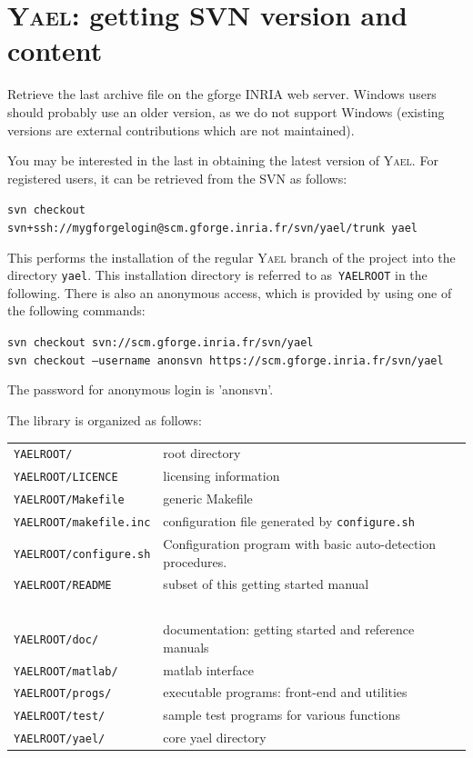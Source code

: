 \documentclass[a4paper,11pt,notitlepage,final,twoside]{report}
\newcommand{\yael}{\textsc{Yael}\xspace}
\newcommand{\yroot}{\texttt{YAELROOT}\xspace}
\newcommand{\tc}[1]{\texttt{#1}}
\newcommand{\code}[1]{\smallskip 

\texttt{#1} 
 \medskip

}
\begin{document}
\section{\yael: getting SVN version and content}

Retrieve the last archive file on the gforge INRIA web server. 
Windows users should probably use an older version, as we do not support Windows (existing 
versions are external contributions which are not maintained). 
\medskip

You may be interested in the last in obtaining the latest version of \yael. 
For registered users, it can be retrieved from the SVN as follows:

\code{svn checkout svn+ssh://mygforgelogin@scm.gforge.inria.fr/svn/yael/trunk yael}

This performs the installation of the regular \yael branch of the project into the directory \texttt{yael}. 
This installation directory is referred to as~\yroot in the following. 
There is also an anonymous access, which is provided by using one of the following commands:

\code{svn checkout svn://scm.gforge.inria.fr/svn/yael \\
svn checkout --username anonsvn https://scm.gforge.inria.fr/svn/yael
}

The password for anonymous login is 'anonsvn'. 
\medskip


The library is organized as follows: 
\smallskip

\begin{tabular}{ll}
\tc{\yroot/}         & root directory \\
\tc{\yroot/LICENCE}  & licensing information \\
\tc{\yroot/Makefile} & generic Makefile \\
\tc{\yroot/makefile.inc}  & configuration file generated by \tc{configure.sh}\\
\tc{\yroot/configure.sh}  & Configuration program with basic auto-detection procedures.  \\
\tc{\yroot/README}   & subset of this getting started manual \\
~\\
\tc{\yroot/doc/}     & documentation: getting started and reference manuals \\
\tc{\yroot/matlab/}  & matlab interface \\
\tc{\yroot/progs/}   & executable programs: front-end and utilities \\
\tc{\yroot/test/}    & sample test programs for various functions \\
\tc{\yroot/yael/}    & core yael directory  \\
\end{tabular}
\end{document}
